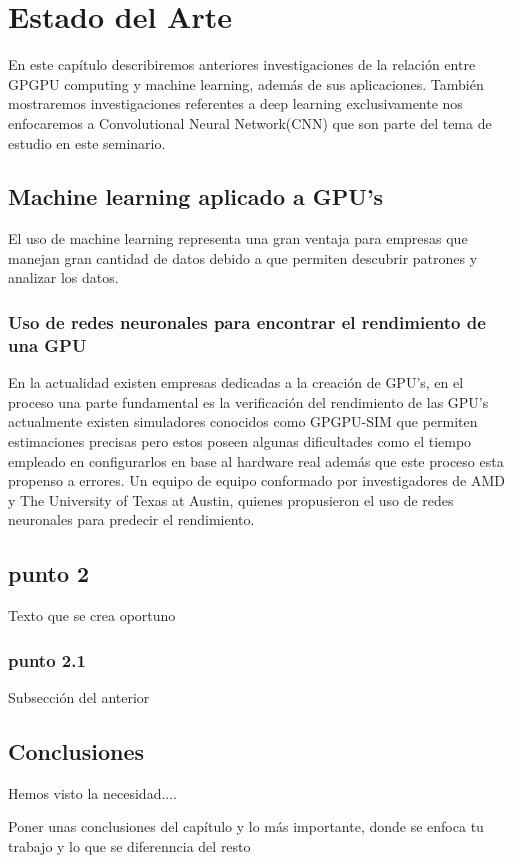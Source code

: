 \chapter{Estado del Arte}
En este capítulo describiremos anteriores investigaciones de la relación entre GPGPU computing y machine learning, además de sus aplicaciones. También mostraremos investigaciones referentes a deep learning exclusivamente nos enfocaremos a Convolutional Neural Network(CNN) que son parte del tema de estudio en este seminario. 




\section{Machine learning aplicado a GPU's}
El uso de machine learning representa una gran ventaja para empresas que manejan gran cantidad de datos debido a que permiten descubrir patrones y analizar los datos.

\subsection{Uso de redes neuronales para encontrar el rendimiento de una GPU}
En la actualidad existen empresas dedicadas a la creación de GPU's, en el proceso una parte fundamental es la verificación del rendimiento de las GPU's actualmente existen simuladores conocidos como GPGPU-SIM que permiten estimaciones precisas pero estos poseen algunas dificultades como el tiempo empleado en configurarlos en base al hardware real además que este proceso esta propenso a errores. Un equipo de equipo conformado por investigadores de AMD y The University of Texas at Austin, quienes propusieron el uso de redes neuronales para predecir el rendimiento.
\section{punto 2}
Texto que se crea oportuno

\subsection{punto 2.1}
Subsección del anterior

\section{Conclusiones}
Hemos visto la necesidad....

Poner unas conclusiones del capítulo y lo más importante, donde se enfoca tu trabajo y lo que se diferenncia del resto

